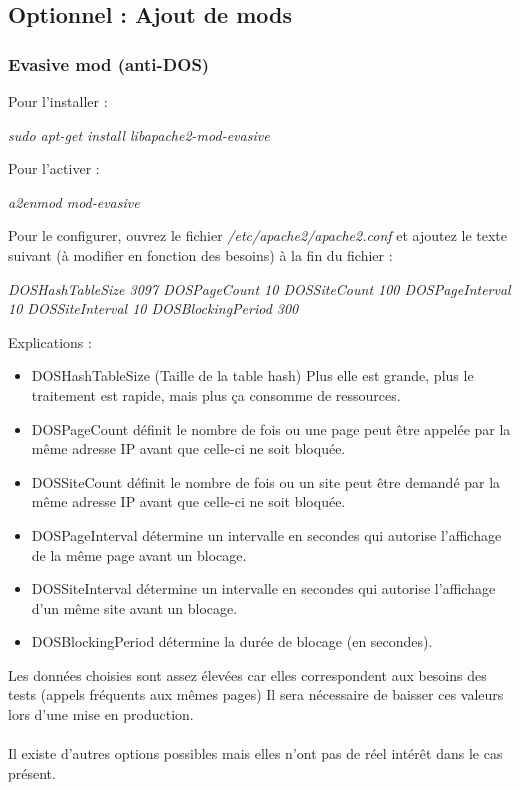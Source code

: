 \documentclass[a4paper,12pt,titlepage]{article}
\begin{document}
\subsection{Optionnel : Ajout de mods}

\subsubsection{Evasive mod (anti-DOS)}

Pour l'installer :

\emph{sudo apt-get install libapache2-mod-evasive}

Pour l'activer : 

\emph{a2enmod mod-evasive}

Pour le configurer, ouvrez le fichier \emph{/etc/apache2/apache2.conf} et ajoutez le texte suivant (à modifier en fonction des besoins) à la fin du fichier :

\emph{DOSHashTableSize 3097
 DOSPageCount 10
 DOSSiteCount 100
 DOSPageInterval 10
 DOSSiteInterval 10
 DOSBlockingPeriod 300}
 
Explications :
\begin{itemize}
\item DOSHashTableSize (Taille de la table hash) Plus elle est grande, plus le traitement est rapide, mais plus ça consomme de ressources.
\item DOSPageCount définit le nombre de fois ou une page peut être appelée par la même adresse IP avant que celle-ci ne soit bloquée.
\item DOSSiteCount définit le nombre de fois ou un site peut être demandé par la même adresse IP avant que celle-ci ne soit bloquée.
\item DOSPageInterval détermine un intervalle en secondes qui autorise l’affichage de la même page avant un blocage.
\item DOSSiteInterval détermine un intervalle en secondes qui autorise l’affichage d’un même site avant un blocage.
\item DOSBlockingPeriod détermine la durée de blocage (en secondes).
\end{itemize} 

Les données choisies sont assez élevées car elles correspondent aux besoins des tests (appels fréquents aux mêmes pages) Il sera nécessaire de baisser ces valeurs lors d'une mise en production.
\paragraph{}
Il existe d'autres options possibles mais elles n'ont pas de réel intérêt dans le cas présent.
\end{document}
